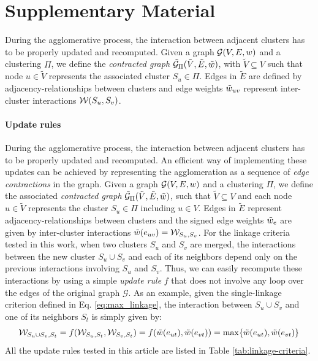 \section{Supplementary Material}
During the agglomerative process, the interaction between adjacent clusters has to be properly updated and recomputed.  %
Given a graph $\mathcal{G}(V,E,w)$ and a clustering $\Pi$, we define the \emph{contracted graph} $\tilde{\mathcal{G}}_\Pi(\tilde{V}, \tilde{E}, \tilde{w})$, with $\tilde{V} \subseteq V$ such that node $u\in \tilde{V}$ represents the associated cluster $S_u \in \Pi$. Edges in $\tilde{E}$ are defined by adjacency-relationships between clusters and edge weights $\tilde{w}_{uv}$ represent inter-cluster interactions $\mathcal{W}(S_u,S_v)$. 



\paragraph{Update rules} During the agglomerative process, the interaction between adjacent clusters has to be properly updated and recomputed.  %
An efficient way of implementing these updates can be achieved by representing the agglomeration as a sequence of \emph{edge contractions} in the graph. Given a graph $\mathcal{G}(V,E,w)$ and a clustering $\Pi$, we define the associated \emph{contracted graph} $\tilde{\mathcal{G}}_\Pi(\tilde{V}, \tilde{E}, \tilde{w})$, such that $\tilde{V} \subseteq V$ and each node $u\in \tilde{V}$ represents the cluster $S_u \in \Pi$ including $u\in V$. Edges in $\tilde{E}$ represent adjacency-relationships between clusters and the signed edge weights $\tilde{w}_e$ are given by inter-cluster interactions $\tilde{w}(e_{uv})=\mathcal{W}_{S_u,S_v}$. 
For the linkage criteria tested in this work, when two clusters $S_u$ and $S_v$ are merged, the interactions between the new cluster $S_u \cup S_v$ and each of its neighbors depend only on the previous interactions involving $S_u$ and $S_v$. Thus, we can easily recompute these interactions by using a simple \emph{update rule} $f$ that does not involve any loop over the edges of the original graph $\mathcal{G}$. As an example, given the single-linkage criterion defined in Eq. \ref{eq:max_linkage}, the interaction between $S_u \cup S_v$ and one of its neighbors $S_t$ is simply given by:
\begin{equation}
  \mathcal{W}_{S_u \cup S_v,S_t} = f( \mathcal{W}_{S_u,S_t}, \mathcal{W}_{S_v,S_t}) = f(\tilde{w}(e_{ut}), \tilde{w}(e_{vt})) = \max \{ \tilde{w}(e_{ut}), \tilde{w}(e_{vt}) \}
\end{equation}
All the update rules tested in this article are listed in Table \ref{tab:linkage-criteria}.

